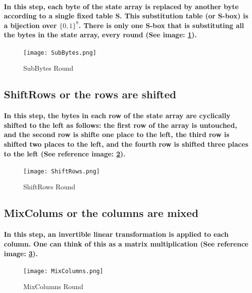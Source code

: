 \paragraph{In this step, each byte of the state array is replaced by another byte according to a single fixed table S. This substitution table (or S-box) is a bijection over $\{0,1\}^8$. There is only one S-box that is substituting all the bytes in the state array, every round (See image: \ref{fig: SubBytes}).}\cite[p. 186]{Katz}

\begin{figure}
\centering
\texttt{[image: SubBytes.png]}
\caption{\label{fig: SubBytes} SubBytes Round}\cite[Webpage]{Crawford}
\end{figure}


\subsection{ShiftRows or the rows are shifted}
\paragraph{In this step, the bytes in each row of the state array are cyclically shifted to the left as follows: the first row of the array is untouched, and the second row is shifte one place to the left, the third row is shifted two places to the left, and the fourth row is shifted three places to the left (See reference image: \ref{fig: ShiftRows}).}\cite[p. 186]{Katz}

\begin{figure}
\centering
\texttt{[image: ShiftRows.png]}
\caption{\label{fig: ShiftRows} ShiftRows Round}\cite[Webpage]{Crawford}
\end{figure}

\subsection{MixColums or the columns are mixed}
\paragraph{In this step, an invertible linear transformation is applied to each column. One can think of this as a matrix multiplication (See reference image: \ref{fig: MixColumns}).}\cite[p. 186]{Katz}

\begin{figure}
\centering
\texttt{[image: MixColumns.png]}
\caption{\label{fig: MixColumns} MixColumns Round}\cite[Webpage]{Crawford}
\end{figure}

